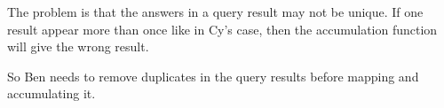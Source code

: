 \documentclass[a4paper,12pt]{article}
\begin{document}
The problem is that the answers in a query result may not be unique.
If one result appear more than once like in Cy's case, then the
accumulation function will give the wrong result.

So Ben needs to remove duplicates in the query results before mapping
and accumulating it.
\end{document}
